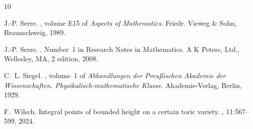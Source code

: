 \documentclass[a4paper, twoside, 11pt]{amsart}
\theoremstyle{definition}
\begin{document}
\begin{thebibliography}{10}
{
J.-P. Serre.
, volume E15 of {\em Aspects of Mathematics}.
\newblock Friedr. Vieweg \& Sohn, Braunschweig, 1989.

J.-P. Serre.
.
\newblock Number~1 in Research Notes in Mathematics. A K Peters, Ltd., Wellesley, MA, 2 edition, 2008.

C.~L. Siegel.
, volume~1 of {\em Abhandlungen der Preußischen Akademie der Wissenschaften. Physikalisch-mathematische Klasse}.
\newblock Akademie-Verlag, Berlin, 1929.

F.~Wilsch.
\newblock Integral points of bounded height on a certain toric variety.
, 11:567--599, 2024.
}
\end{thebibliography}
\end{document}
